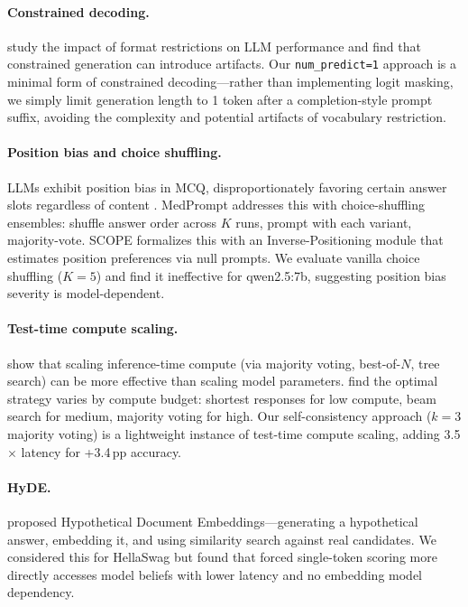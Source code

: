 \documentclass[11pt]{article}
\begin{document}
\paragraph{Constrained decoding.}
\citet{tam2024} study the impact of format restrictions on LLM performance and find that constrained generation can introduce artifacts. Our \texttt{num\_predict=1} approach is a minimal form of constrained decoding---rather than implementing logit masking, we simply limit generation length to 1 token after a completion-style prompt suffix, avoiding the complexity and potential artifacts of vocabulary restriction.

\paragraph{Position bias and choice shuffling.}
LLMs exhibit position bias in MCQ, disproportionately favoring certain answer slots regardless of content \citep{scope2025}. MedPrompt addresses this with choice-shuffling ensembles: shuffle answer order across $K$ runs, prompt with each variant, majority-vote. SCOPE formalizes this with an Inverse-Positioning module that estimates position preferences via null prompts. We evaluate vanilla choice shuffling ($K{=}5$) and find it ineffective for qwen2.5:7b, suggesting position bias severity is model-dependent.

\paragraph{Test-time compute scaling.}
\citet{snell2024} show that scaling inference-time compute (via majority voting, best-of-$N$, tree search) can be more effective than scaling model parameters. \citet{brown2024} find the optimal strategy varies by compute budget: shortest responses for low compute, beam search for medium, majority voting for high. Our self-consistency approach ($k{=}3$ majority voting) is a lightweight instance of test-time compute scaling, adding 3.5$\times$ latency for +3.4\,pp accuracy.

\paragraph{HyDE.}
\citet{gao2023hyde} proposed Hypothetical Document Embeddings---generating a hypothetical answer, embedding it, and using similarity search against real candidates. We considered this for HellaSwag but found that forced single-token scoring more directly accesses model beliefs with lower latency and no embedding model dependency.
\end{document}
